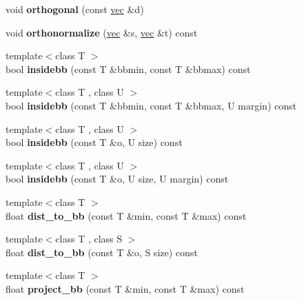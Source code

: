 \begin{DoxyCompactItemize}
void {\bfseries orthogonal} (const \hyperlink{structvec}{vec} \&d)
\item 
\mbox{\label{structvec_a8cf741222331e3009b5beae96a77debe}} 
void {\bfseries orthonormalize} (\hyperlink{structvec}{vec} \&s, \hyperlink{structvec}{vec} \&t) const
\item 
\mbox{\label{structvec_afa22db7991a82e11257e0adeeb11c3db}} 
{\footnotesize template$<$class T $>$ }\\bool {\bfseries insidebb} (const T \&bbmin, const T \&bbmax) const
\item 
\mbox{\label{structvec_a6893b94a9a9244ea76fc0494b4fb71de}} 
{\footnotesize template$<$class T , class U $>$ }\\bool {\bfseries insidebb} (const T \&bbmin, const T \&bbmax, U margin) const
\item 
\mbox{\label{structvec_a2772724ff1367c9368894a2007963a1f}} 
{\footnotesize template$<$class T , class U $>$ }\\bool {\bfseries insidebb} (const T \&o, U size) const
\item 
\mbox{\label{structvec_a7a7ccd21338512a441ab4ee06fac8b31}} 
{\footnotesize template$<$class T , class U $>$ }\\bool {\bfseries insidebb} (const T \&o, U size, U margin) const
\item 
\mbox{\label{structvec_af797b3e9d1d0abb12056c40807388bef}} 
{\footnotesize template$<$class T $>$ }\\float {\bfseries dist\+\_\+to\+\_\+bb} (const T \&min, const T \&max) const
\item 
\mbox{\label{structvec_a05e912377801236970544eee6963f84d}} 
{\footnotesize template$<$class T , class S $>$ }\\float {\bfseries dist\+\_\+to\+\_\+bb} (const T \&o, S size) const
\item 
\mbox{\label{structvec_aee7bf78524dbde1182109b598e994493}} 
{\footnotesize template$<$class T $>$ }\\float {\bfseries project\+\_\+bb} (const T \&min, const T \&max) const
\item 

\end{DoxyCompactItemize}
